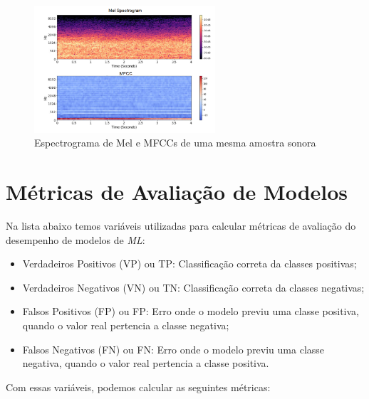 \begin{figure}[]
\centering
\includegraphics[width=0.6\textwidth]{img/melspec-vs-mfcc.PNG}
\caption{\label{fig:melspecvsmfcc}Espectrograma de Mel e \acrshort{MFCC}s de uma mesma amostra sonora}
\author{Fonte: Imagem adaptada de~\cite{64}}
\end{figure}

\section{Métricas de Avaliação de Modelos}\label{sec:metricas}

Na lista abaixo temos variáveis utilizadas para calcular métricas de avaliação do desempenho de modelos de \textit{ML}:

\begin{itemize}
    \item Verdadeiros Positivos (VP) ou \acrlong{TP}: Classificação correta da classes positivas;
    \item Verdadeiros Negativos (VN) ou \acrlong{TN}: Classificação correta da classes negativas;
    \item Falsos Positivos (FP) ou \acrlong{FP}: Erro onde o modelo previu uma classe positiva, quando o valor real pertencia a classe negativa;
    \item Falsos Negativos (FN) ou \acrlong{FN}: Erro onde o modelo previu uma classe negativa, quando o valor real pertencia a classe positiva.
\end{itemize}

Com essas variáveis, podemos calcular as seguintes métricas:

